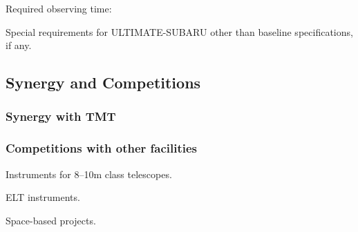 Required observing time:

Special requirements for ULTIMATE-SUBARU other than baseline
specifications, if any.

\subsection{Synergy and Competitions}

\subsubsection{Synergy with TMT}

\subsubsection{Competitions with other facilities}

Instruments for 8--10m class telescopes.

ELT instruments.

Space-based projects.



